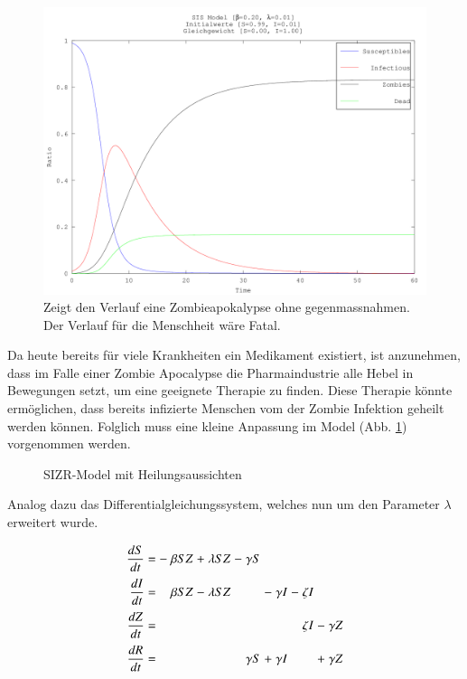 \begin{refsection}
\[\begin{array}{rccrcrcrcrcr}
 \end{array}
\]
\begin{figure}[ht]
	\centering
	\includegraphics[width=1\textwidth]{sir/images/Zombies_nicht_heilbar}
  \caption[Zombie Apokalypse]{Zeigt den Verlauf eine Zombieapokalypse ohne gegenmassnahmen. Der Verlauf für die Menschheit wäre Fatal.}
\end{figure}

Da heute bereits für viele Krankheiten ein Medikament existiert, ist anzunehmen, dass im Falle einer Zombie Apocalypse die Pharmaindustrie alle Hebel in Bewegungen setzt, um eine geeignete Therapie zu finden. Diese Therapie könnte ermöglichen, dass bereits infizierte Menschen vom der Zombie Infektion geheilt werden können. Folglich muss eine kleine Anpassung im Model (Abb. \ref{fig:zombie_healing}) vorgenommen werden. 
\begin{figure}[ht]
  \centering
  
  \caption{SIZR-Model mit Heilungsaussichten}
  \label{fig:zombie_healing}
\end{figure}
Analog dazu das Differentialgleichungssystem, welches nun um den Parameter $\lambda$ erweitert wurde.
\[
\arraycolsep=1.4pt\def\arraystretch{2.2}
  \begin{array}{rccrcrcrcrcrcr}
   \displaystyle\frac{dS}{dt} & = &-& \beta S Z  &+& \lambda S Z   &-&  \gamma S & &         & & & & \\
   \displaystyle\frac{dI}{dt} & = & & \beta S Z  &-& \lambda S Z   & &           &-&\gamma I &-& \zeta I\\
   \displaystyle\frac{dZ}{dt} & = & &            & &               & &           & &         & & \zeta I  &-& \gamma Z \\   
   \displaystyle\frac{dR}{dt} & = & &            & &               & &  \gamma S &+&\gamma I & &          &+& \gamma Z \\


\end{array}\]
\end{refsection}
